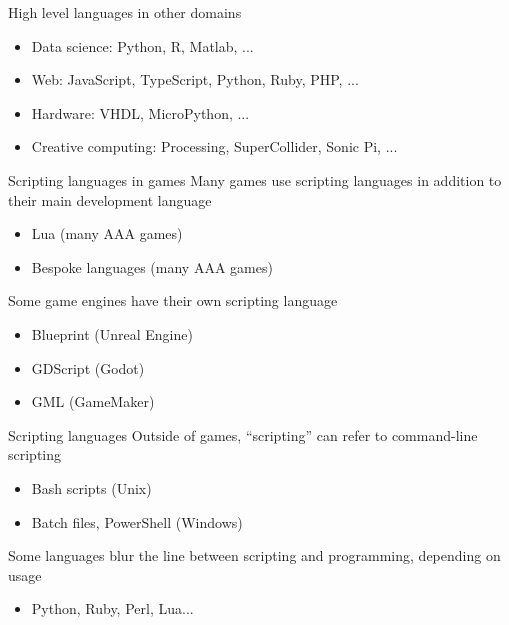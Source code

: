 \begin{frame}{High level languages in other domains}
	\begin{itemize}
		\pause\item Data science: Python, R, Matlab, ...
		\pause\item Web: JavaScript, TypeScript, Python, Ruby, PHP, ...
		\pause\item Hardware: VHDL, MicroPython, ...
		\pause\item Creative computing: Processing, SuperCollider, Sonic Pi, ...
	\end{itemize}
\end{frame}

\begin{frame}{Scripting languages in games}
	\pause Many games use scripting languages in addition to their main development language
	\begin{itemize}
		\pause\item Lua (many AAA games)
		\pause\item Bespoke languages (many AAA games)
	\end{itemize}
	\pause Some game engines have their own scripting language
	\begin{itemize}
		\pause\item Blueprint (Unreal Engine)
		\pause\item GDScript (Godot)
		\pause\item GML (GameMaker)
	\end{itemize}
\end{frame}

\begin{frame}{Scripting languages}
	\pause Outside of games, ``scripting'' can refer to command-line scripting
	\begin{itemize}
		\pause\item Bash scripts (Unix)
		\pause\item Batch files, PowerShell (Windows)
	\end{itemize}
	\pause Some languages blur the line between scripting and programming, depending on usage
	\begin{itemize}
		\pause\item Python, Ruby, Perl, Lua...
	\end{itemize}
\end{frame}

